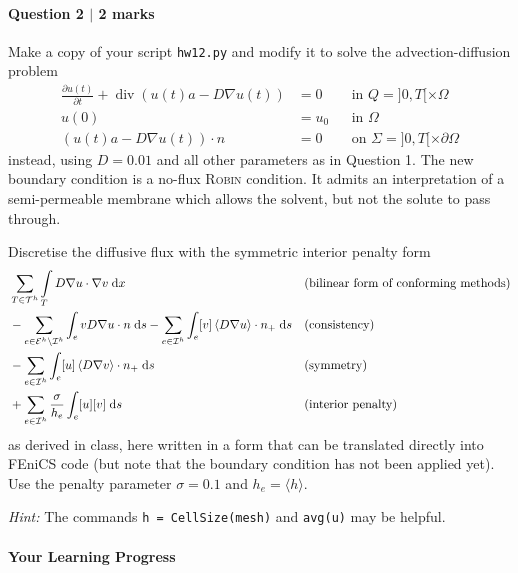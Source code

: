 \newpage

\paragraph*{Question 2 $\vert$ 2 marks}%

Make a copy of your script \texttt{hw12.py} and modify it to solve the advection-diffusion problem
\begin{subequations}\label{eq:advection-diffusion}
\begin{align}
\frac{\partial u(t)}{\partial t} + \operatorname{div} (u(t)a - D\nabla u(t)) &= 0 && \text{in } Q = ]0,T[ \times \Omega\\
u(0) &= u_0 && \text{in } \Omega\\
\left(u(t)a-D\nabla u(t)\right) \cdot n &= 0 && \text{on } \Sigma = ]0,T[ \times \partial\Omega
\end{align}
\end{subequations}
instead, using $D = 0.01$ and all other parameters as in Question 1. The new boundary condition is a no-flux \textsc{Robin} condition. It admits an interpretation of a semi-permeable membrane which allows the solvent, but not the solute to pass through.

Discretise the diffusive flux with the symmetric interior penalty form
\begin{align*}
&\sum_{T\in\mathcal{T}^h} \int\limits_T D\nabla u \cdot \nabla v \;\mathrm{d}x && \text{(bilinear form of conforming methods)}\\
&- \sum_{e\in\mathcal{E}^h\setminus\mathcal{I}^h} \int_e vD\nabla u \cdot n \;\mathrm{d}s - \sum_{e\in\mathcal{I}^h} \int_e [v]\left\langle D\nabla u\right\rangle\cdot n_+ \;\mathrm{d}s && \text{(consistency)}\\
&- \sum_{e\in\mathcal{I}^h} \int_e [u]\left\langle D\nabla v\right\rangle\cdot n_+ \;\mathrm{d}s && \text{(symmetry)}\\
&+ \sum_{e\in\mathcal{I}^h} \frac{\sigma}{h_e} \int_e [u] [v] \;\mathrm{d}s && \text{(interior penalty)}
\end{align*}
as derived in class, here written in a form that can be translated directly into \textsf{FEniCS} code (but note that the boundary condition has not been applied yet). Use the penalty parameter $\sigma = 0.1$ and $h_e = \langle h \rangle$.

\emph{Hint:} The commands \verb|h = CellSize(mesh)| and \verb|avg(u)| may be helpful.

\paragraph*{Your Learning Progress}%

